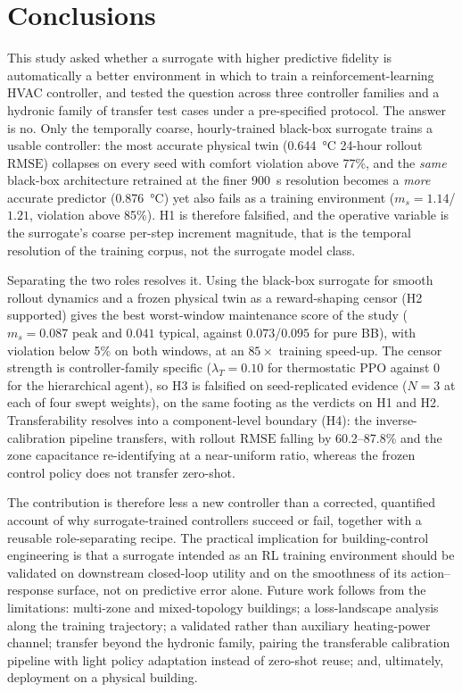 \documentclass[5p]{elsarticle}
\newcommand{\RMSE}{\ensuremath{\mathrm{RMSE}}}
\newcommand{\ms}{\ensuremath{m_s}}
\begin{document}
\section{Conclusions}\label{sec:conclusions}

This study asked whether a surrogate with higher predictive fidelity is automatically a better
environment in which to train a reinforcement-learning HVAC controller, and tested the question
across three controller families and a hydronic family of transfer test cases under a pre-specified
protocol. The answer is no. Only the temporally coarse, hourly-trained black-box surrogate trains a
usable controller: the most accurate physical twin (\SI{0.644}{\celsius} 24-hour rollout \RMSE)
collapses on every seed with comfort violation above 77\%, and the \emph{same} black-box
architecture retrained at the finer \SI{900}{\second} resolution becomes a \emph{more} accurate
predictor (\SI{0.876}{\celsius}) yet also fails as a training environment ($\ms=1.14$/$1.21$,
violation above 85\%). H1 is therefore falsified, and the operative variable is the surrogate's
coarse per-step increment magnitude, that is the temporal resolution of the training corpus, not the
surrogate model class.

Separating the two roles resolves it. Using the black-box surrogate for smooth rollout dynamics and
a frozen physical twin as a reward-shaping censor (H2 supported) gives the best worst-window
maintenance score of the study ($\ms=0.087$ peak and $0.041$ typical, against $0.073$/$0.095$ for
pure BB), with violation below 5\% on both windows, at an $85\times$ training speed-up. The censor strength is controller-family specific ($\lambda_T=0.10$ for thermostatic PPO
against $0$ for the hierarchical agent), so H3 is falsified on seed-replicated evidence ($N=3$ at
each of four swept weights), on the same footing as the verdicts on H1 and H2. Transferability resolves into a
component-level boundary (H4): the inverse-calibration pipeline transfers, with rollout \RMSE{}
falling by 60.2--87.8\% and the zone capacitance re-identifying at a near-uniform ratio, whereas the
frozen control policy does not transfer zero-shot.

The contribution is therefore less a new controller than a corrected, quantified account of why
surrogate-trained controllers succeed or fail, together with a reusable role-separating recipe. The
practical implication for building-control engineering is that a surrogate intended as an RL
training environment should be validated on downstream closed-loop utility and on the smoothness of
its action--response surface, not on predictive error alone. Future work follows from the
limitations: multi-zone and mixed-topology buildings; a loss-landscape analysis along the training
trajectory; a validated rather than auxiliary heating-power channel; transfer beyond the hydronic
family, pairing the transferable calibration pipeline with light policy adaptation instead of
zero-shot reuse; and, ultimately, deployment on a physical building.
\end{document}
